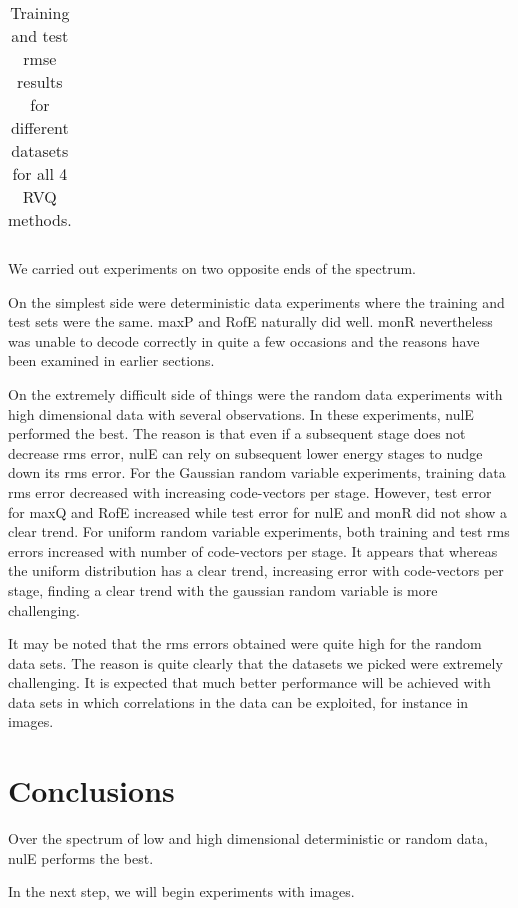\begin{table}
\begin{tabular}{|p{2.5in}|c|p{0.7in}|c|c|c|c|}
\end{tabular}
\caption{Training and test rmse results for different datasets for all 4 RVQ methods.}
\label{table:results}
\end{table}

We carried out experiments on two opposite ends of the spectrum. 

On the simplest side were deterministic data experiments where the training and test sets were the same.  maxP and RofE naturally did well.  monR nevertheless was unable to decode correctly in quite a few occasions and the reasons have been examined in earlier sections.  

On the extremely difficult side of things were the random data experiments with high dimensional data with several observations.  In these experiments, nulE performed the best.  The reason is that even if a subsequent stage does not decrease rms error, nulE can rely on subsequent lower energy stages to nudge down its rms error.  For the Gaussian random variable experiments, training data rms error decreased with increasing code-vectors per stage.  However, test error for maxQ and RofE increased while test error for nulE and monR did not show a clear trend.  For uniform random variable experiments, both training and test rms errors increased with number of code-vectors per stage.  It appears that whereas the uniform distribution has a clear trend, increasing error with code-vectors per stage, finding a clear trend with the gaussian random variable is more challenging.

It may be noted that the rms errors obtained were quite high for the random data sets.  The reason is quite clearly that the datasets we picked were extremely challenging.  It is expected that much better performance will be achieved with data sets in which correlations in the data can be exploited, for instance in images.

\section{Conclusions}
Over the spectrum of low and high dimensional deterministic or random data, nulE performs the best.

In the next step, we will begin experiments with images.


%

